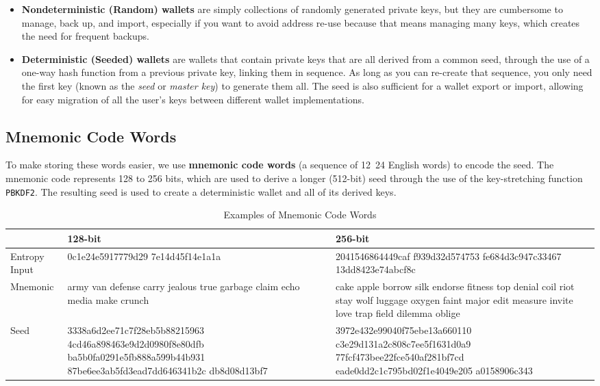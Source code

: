 \documentclass{article}
\newcounter{code}[section]
\begin{document}
    \begin{itemize}
      \item \textbf{Nondeterministic (Random) wallets} are simply collections of randomly generated private keys, but they are cumbersome to manage, back up, and import, especially if you want to avoid address re-use because that means managing many keys, which creates the need for frequent backups.
      \item \textbf{Deterministic (Seeded) wallets} are wallets that contain private keys that are all derived from a common seed, through the use of a one-way hash function from a previous private key, linking them in sequence. As long as you can re-create that sequence, you only need the first key (known as the \textit{seed} or \textit{master key}) to generate them all. The seed is also sufficient for a wallet export or import, allowing for easy migration of all the user's keys between different wallet implementations.
    \end{itemize}

  \subsection{Mnemonic Code Words}

    To make storing these words easier, we use \textbf{mnemonic code words} (a sequence of 12~24 English words) to encode the seed. The mnemonic code represents 128 to 256 bits, which are used to derive a longer (512-bit) seed through the use of the key-stretching function \texttt{PBKDF2}. The resulting seed is used to create a deterministic wallet and all of its derived keys.

    \begin{table}[H]
      \centering
      \begin{tabular}{|l|p{5cm}|p{5cm}|}
      \hline
       & \textbf{128-bit} & \textbf{256-bit} \\
      \hline
      Entropy Input & 0c1e24e5917779d29 7e14d45f14e1a1a & 2041546864449caf f939d32d574753 fe684d3c947c33467 13dd8423e74abcf8c \\
      \hline
      Mnemonic & army van defense carry jealous true garbage claim echo media make crunch & cake apple borrow silk endorse fitness top denial coil riot stay wolf luggage oxygen faint major edit measure invite love trap field dilemma oblige \\
      \hline
      Seed & 
      3338a6d2ee71c7f28eb5b88215963
      4cd46a898463e9d2d0980f8e80dfb
      ba5b0fa0291e5fb888a599b44b931
      87be6ee3ab5fd3ead7dd646341b2c
      db8d08d13bf7 & 
      3972e432e99040f75ebe13a660110
      c3e29d131a2c808c7ee5f1631d0a9
      77fcf473bee22fce540af281bf7cd
      eade0dd2c1c795bd02f1e4049e205
      a0158906c343 \\
      \hline
      \end{tabular}
      \caption{Examples of Mnemonic Code Words}
    \end{table}
\end{document}
